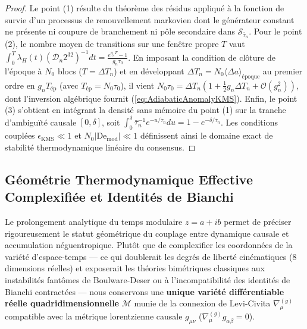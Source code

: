 \documentclass[10pt,twocolumn,a4paper]{article}
\theoremstyle{plain}
\theoremstyle{definition}
\theoremstyle{remark}
\begin{document}
\begin{proof}
Le point (1) résulte du théorème des résidus appliqué à la fonction de survie d'un processus de renouvellement markovien dont le générateur constant ne présente ni coupure de branchement ni pôle secondaire dans $\mathcal{S}_{\bar{\tau}_n}$. Pour le point (2), le nombre moyen de transitions sur une fenêtre propre $T$ vaut $\int_0^T \lambda_H(t) (\mathcal{D}_n 2^{32})^{-1} dt = \frac{e^{g_n T} - 1}{g_n \tau_0}$. En imposant la condition de clôture de l'époque à $N_0$ blocs ($T = \Delta T_n$) et en développant $\Delta T_n = N_0 \langle \Delta a \rangle_{\text{époque}}$ au premier ordre en $g_n T_{\text{ép}}$ (avec $T_{\text{ép}} = N_0 \tau_0$), il vient $N_0 \tau_0 = \Delta T_n (1 + \frac{1}{2} g_n \Delta T_n + \mathcal{O}(g_n^2))$, dont l'inversion algébrique fournit (\ref{eq:AdiabaticAnomalyKMS}). Enfin, le point (3) s'obtient en intégrant la densité sans mémoire du point (1) sur la tranche d'ambiguïté causale $[0, \delta]$, soit $\int_0^\delta \bar{\tau}_n^{-1} e^{-u/\bar{\tau}_n} du = 1 - e^{-\delta/\bar{\tau}_n}$. Les conditions couplées $\epsilon_{\text{KMS}} \ll 1$ et $N_0 |\mathrm{De}_{\text{mod}}| \ll 1$ définissent ainsi le domaine exact de stabilité thermodynamique linéaire du consensus.
\end{proof}

\subsection{Géométrie Thermodynamique Effective Complexifiée et Identités de Bianchi}
\label{subsec:complex_geometry_bianchi}

Le prolongement analytique du temps modulaire $z = a + ib$ permet de préciser rigoureusement le statut géométrique du couplage entre dynamique causale et accumulation néguentropique. Plutôt que de complexifier les coordonnées de la variété d'espace-temps — ce qui doublerait les degrés de liberté cinématiques (8 dimensions réelles) et exposerait les théories bimétriques classiques aux instabilités fantômes de Boulware-Deser ou à l'incompatibilité des identités de Bianchi contractées — nous conservons une \textbf{unique variété différentiable réelle quadridimensionnelle} $\mathcal{M}$ munie de la connexion de Levi-Civita $\nabla_\mu^{(g)}$ compatible avec la métrique lorentzienne causale $g_{\mu\nu}$ ($\nabla_\mu^{(g)} g_{\alpha\beta} = 0$).
\end{document}

